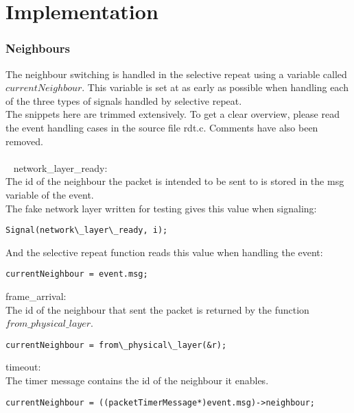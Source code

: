 \section{Implementation}

\subsubsection{Neighbours}
The neighbour switching is handled in the selective repeat using a variable called $currentNeighbour$. This variable is set at as early as possible when handling each of the three types of signals handled by selective repeat.\\
The snippets here are trimmed extensively. To get a clear overview, please read the event handling cases in the source file rdt.c. Comments have also been removed.\\
\\~
network\_layer\_ready:\\
The id of the neighbour the packet is intended to be sent to is stored in the msg variable of the event.\\
The fake network layer written for testing gives this value when signaling:
\begin{lstlisting}
Signal(network\_layer\_ready, i);
\end{lstlisting}
And the selective repeat function reads this value when handling the event:
\begin{lstlisting}
currentNeighbour = event.msg;
\end{lstlisting}

frame\_arrival:\\
The id of the neighbour that sent the packet is returned by the function $from\_physical\_layer$.
\begin{lstlisting}
currentNeighbour = from\_physical\_layer(&r);
\end{lstlisting}

timeout:\\
The timer message contains the id of the neighbour it enables.
\begin{lstlisting}
currentNeighbour = ((packetTimerMessage*)event.msg)->neighbour;
\end{lstlisting}
